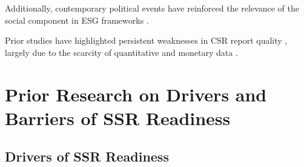 Additionally, contemporary political events have reinforced the relevance of the social component in ESG frameworks 
\parencite{She2022}.

Prior studies have highlighted 
persistent weaknesses in CSR report quality \parencite{DiChiacchio2024}, largely due to the scarcity of 
quantitative and monetary data \parencite{Michelon2015}.

\section{Prior Research on Drivers and Barriers of SSR Readiness}

\subsection{Drivers of SSR Readiness}









